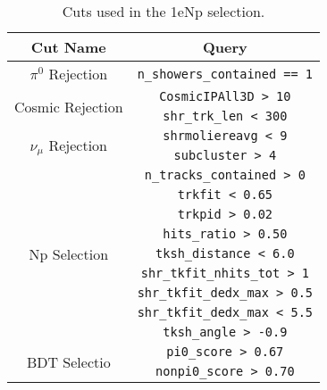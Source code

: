 \renewcommand{\arraystretch}{1.4}
\begin{table}[H]
    \centering
    \begin{tabular}{c|c}
        \hline
        \hline
        Cut Name & Query \\
        \hline
        \hline
        \multirow{1}{*}{$\pi^0$ Rejection} & \verb|n_showers_contained == 1| \\
        \hline
        \multirow{2}{*}{Cosmic Rejection} & \verb|CosmicIPAll3D > 10| \\
        & \verb|shr_trk_len < 300| \\
        \hline
        \multirow{2}{*}{$\nu_{\mu}$ Rejection} & \verb|shrmoliereavg < 9| \\
        & \verb|subcluster > 4| \\
        \hline
        \multirow{9}{*}{Np Selection} & \verb|n_tracks_contained > 0| \\
        & \verb|trkfit < 0.65| \\
        & \verb|trkpid > 0.02| \\
        & \verb|hits_ratio > 0.50| \\
        & \verb|tksh_distance < 6.0| \\
        & \verb|shr_tkfit_nhits_tot > 1| \\
        & \verb|shr_tkfit_dedx_max > 0.5| \\
        & \verb|shr_tkfit_dedx_max < 5.5| \\
        & \verb|tksh_angle > -0.9| \\
        \hline
        \multirow{2}{*}{BDT Selectio}n & \verb|pi0_score > 0.67| \\ 
        & \verb|nonpi0_score > 0.70| \\
        \hline
        \end{tabular}
    \caption{Cuts used in the 1eNp selection.}
    \label{tab:1eNpSel}    
\end{table}
\renewcommand{\arraystretch}{1.0}

